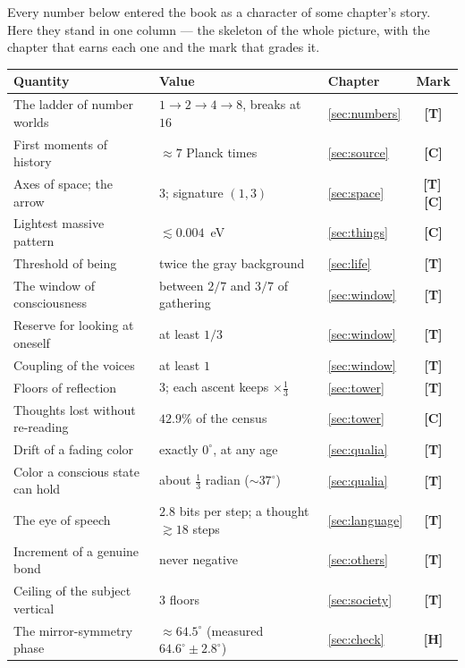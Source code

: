 \documentclass[11pt,letterpaper]{article}
\newcommand{\stT}{\textbf{[T]}\xspace}
\newcommand{\stC}{\textbf{[C]}\xspace}
\newcommand{\stH}{\textbf{[H]}\xspace}
\begin{document}
Every number below entered the book as a character of some chapter's
story. Here they stand in one column --- the skeleton of the whole
picture, with the chapter that earns each one and the mark that
grades it.

\begin{center}\small
\begin{tabular}{@{}lll c@{}}
\toprule
\textbf{Quantity} & \textbf{Value} & \textbf{Chapter} & \textbf{Mark} \\
\midrule
The ladder of number worlds & $1\to2\to4\to8$, breaks at $16$ & \ref{sec:numbers} & \stT \\
First moments of history & $\approx 7$ Planck times & \ref{sec:source} & \stC \\
Axes of space; the arrow & $3$; signature $(1{,}3)$ & \ref{sec:space} & \stT\,\stC \\
Lightest massive pattern & $\lesssim 0.004$~eV & \ref{sec:things} & \stC \\
Threshold of being & twice the gray background & \ref{sec:life} & \stT \\
The window of consciousness & between $2/7$ and $3/7$ of gathering & \ref{sec:window} & \stT \\
Reserve for looking at oneself & at least $1/3$ & \ref{sec:window} & \stT \\
Coupling of the voices & at least $1$ & \ref{sec:window} & \stT \\
Floors of reflection & $3$; each ascent keeps $\times\tfrac13$ & \ref{sec:tower} & \stT \\
Thoughts lost without re-reading & $42.9\%$ of the census & \ref{sec:tower} & \stC \\
Drift of a fading color & exactly $0^\circ$, at any age & \ref{sec:qualia} & \stT \\
Color a conscious state can hold & about $\tfrac13$ radian ($\sim 37^\circ$) & \ref{sec:qualia} & \stT \\
The eye of speech & $2.8$ bits per step; a thought $\gtrsim 18$ steps & \ref{sec:language} & \stT \\
Increment of a genuine bond & never negative & \ref{sec:others} & \stT \\
Ceiling of the subject vertical & $3$ floors & \ref{sec:society} & \stT \\
The mirror-symmetry phase & $\approx 64.5^\circ$ (measured $64.6^\circ\pm2.8^\circ$) & \ref{sec:check} & \stH \\
\bottomrule
\end{tabular}
\end{center}
\end{document}
